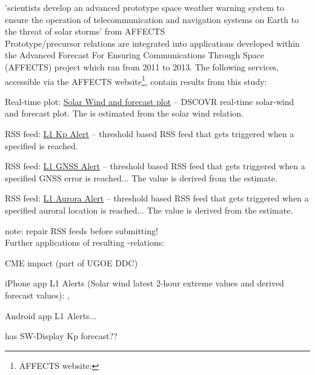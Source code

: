 'scientists develop an advanced prototype space weather warning system to ensure the operation of telecommunication and navigation systems on Earth to the threat of solar storms' from AFFECTS\\

Prototype/precursor relations are integrated into applications developed within the Advanced Forecast For Ensuring Communications Through Space (\mbox{AFFECTS}) project which ran from 2011 to 2013. The following services, accessible via the \mbox{AFFECTS} website\footnote{AFFECTS website: }, contain results from this \Kp{} study:
\begin{itemize*}
	\item Real-time plot: \href{http://www.affects-fp7.eu/rssfeeds/ace_ap_forecast_plot/ace_realtime_ap_CH_GFT_plot.png}{Solar Wind and \Kp{} forecast plot} -- DSCOVR real-time solar-wind and \Kp{} forecast plot. The \Kp{} is estimated from the solar wind relation.
	\item RSS feed: \href{http://www.affects-fp7.eu/rssfeeds/rssfeed_kp/rssfeed_kp.xml}{L1 Kp Alert} -- threshold based RSS feed that gets triggered when a specified \Kp{} is reached.
	\item RSS feed: \href{http://www.affects-fp7.eu/rssfeeds/rssfeed_gnss/rssfeed_gnss.xml}{L1 GNSS Alert} -- threshold based RSS feed that gets triggered when a specified GNSS error is reached... The value is derived from the \Kp{} estimate.
	\item RSS feed: \href{http://www.affects-fp7.eu/rssfeeds/rssfeed_aurora/rssfeed_aurora.xml}{L1 Aurora Alert} -- threshold based RSS feed that gets triggered when a specified auroral location is reached... The value is derived from the \Kp{} estimate.
\end{itemize*}

note: repair RSS feeds before submitting!\\

\noindent Further applications of resulting \Kp{}-relations:
\begin{itemize*}
	\item CME \Kp{} impact (part of UGOE DDC)
	\item iPhone app L1 Alerts (Solar wind latest 2-hour extreme values and derived forecast values): , 
	\item Android app L1 Alerts... 
	\item has SW-Display Kp forecast??
\end{itemize*}

